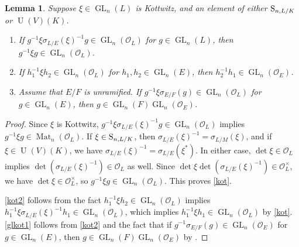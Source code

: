 \documentclass[11pt, reqno]{amsart}
\numberwithin{equation}{subsection}
\theoremstyle{plain}
\newtheorem{lem}[proposition]{Lemma}
\theoremstyle{definition}
\renewcommand{\O}{\mathcal O}
\renewcommand{\S}{\textnormal{S}}
\DeclareMathOperator{\GL}{GL}
\DeclareMathOperator{\Mat}{Mat}
\DeclareMathOperator{\U}{U}
\begin{document}
\begin{lem}
\label{lem:kottwitzproperties}
Suppose $\xi \in \GL_n(L)$ is Kottwitz, and
an element of either $\S_{n,L/K}$ or $\U(V)(K)$.
\begin{enumerate}[\normalfont(1)]
    \item 
    \label{kot}
    If $g^{-1}\xi\sigma_{L/E}(\xi)^{-1} g
    \in \GL_n(\O_L)$ for $g \in \GL_n(L)$, then
    $g^{-1}\xi g \in \GL_n(\O_L)$.
    
    \item
    \label{kot2}
    If $h_1^{-1}\xi h_2 \in \GL_n(\O_L)$ for 
    $h_1, h_2 \in \GL_n(E)$, then $h_2^{-1}h_1 \in 
    \GL_n(\O_E)$.
    
    \item
    \label{glkot1} Assume that $E/F$ is unramified.
 If $g^{-1}\xi\sigma_{E/F}(g)
    \in \GL_n(\O_L)$ for $g \in \GL_n(E)$, then
    $g \in \GL_n(F)\GL_n(\O_E)$.
\end{enumerate}
\end{lem}
\begin{proof}
Since $\xi$ is Kottwitz,
$g^{-1}\xi\sigma_{L/E}(\xi)^{-1} g \in \GL_n(\O_L)$ 
implies $g^{-1}\xi g \in \Mat_n(\O_L)$.
If $\xi \in \S_{n,L/K}$, then $\sigma_{L/E}(\xi)^{-1}
= \sigma_{L/M}(\xi)$, and if $\xi \in \U(V)(K)$,
we have $\sigma_{L/E}(\xi)^{-1} = \sigma_{L/E}(\xi^\ast)$.
In either case, $\det \xi \in \O_L$ implies
$\det(\sigma_{L/E}(\xi)^{-1}) \in \O_L$ as well.
Since $\det\xi \det(\sigma_{L/E}(\xi)^{-1}) 
\in \O_L^\times$, we have $\det \xi \in \O_L^\times$,
so $g^{-1}\xi g \in \GL_n(\O_L)$.
This proves \eqref{kot}.

\eqref{kot2} follows from the fact 
$h_1^{-1}\xi h_2 \in \GL_n(\O_L)$ implies
$h_1^{-1}\xi\sigma_{L/E}(\xi)^{-1}
h_1 \in \GL_n(\O_L)$, which implies $h_1^{-1}\xi h_1
\in \GL_n(\O_L)$ by \eqref{kot}.
\eqref{glkot1} follows from \eqref{kot2}
and the fact that if $g^{-1}\sigma_{E/F}(g)
\in \GL_n(\O_E)$ for $g \in \GL_n(E)$, then
$g \in \GL_n(F)\GL_n(\O_E)$ by 
\cite[Lemma~8.7]{Kottwitz1980}.
\end{proof}
\end{document}
